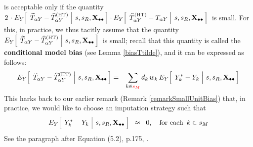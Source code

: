 \begin{itemize}
    is acceptable only if the quantity
    \,$
    2\,\cdot E_{Y}\!\left[\;
        \left.
        \widetilde{T}_{\alpha Y} - \widehat{T}^{\textnormal{(HT)}}_{\alpha Y}
        \;\right\vert\,
        s,s_{R},\mathbf{X}_{\bullet\bullet}
        \,\right]
    \cdot
    {\color{black}E_{Y}\!\left[\;
        \left.
        \widehat{T}^{\textnormal{(HT)}}_{\alpha Y} - T_{\alpha Y}
        \;\right\vert\,
        s,s_{R},\mathbf{X}_{\bullet\bullet}\,\right]}
    $\,
    is small.
    \vskip 0.1cm
    \noindent
    For this, in practice, we thus {\color{red}tacitly assume} that the quantity
    \,$
    E_{Y}\!\left[\;
        \left.
        \widetilde{T}_{\alpha Y} \overset{{\color{white}.}}{-} \widehat{T}^{\textnormal{(HT)}}_{\alpha Y}
        \;\right\vert\,
        s,s_{R},\Xobs
        \,\right]
    $\,
    is small;
    recall that this quantity is called the \textbf{conditional model bias}
    (see Lemma \ref{biasTtilde}), and
    it can be expressed as follows:
    \begin{eqnarray*}
    E_{Y}\!\left[\;
        \left.
        \widetilde{T}_{\alpha Y} \overset{{\color{white}.}}{-} \widehat{T}^{\textnormal{(HT)}}_{\alpha Y}
        \;\right\vert\,
        s,s_{R},\Xobs
        \,\right]
    & = &
        \underset{k\in{\color{red}s_{M}}}{\sum}\,d_{k}\,w_{k}\,
        E_{Y}\!\left[\;
            \left.
            Y^{*}_{k} \overset{{\color{white}.}}{-} Y_{k}
            \;\right\vert\,
            s,s_{R},\Xobs
            \,\right]
    \end{eqnarray*}
    This harks back to our earlier remark (Remark \ref{remarkSmallUnitBias}) that,
    in practice, we would like to choose an imputation strategy such that
    \begin{equation*}
    E_{Y}\!\left[\;
        \left.
        Y^{*}_{k} \overset{{\color{white}.}}{-} Y_{k}
        \;\right\vert\,
        s,s_{R},\Xobs
        \,\right]
    \;\; \approx \;\;
        0,
    \quad
    \textnormal{for each \,$k \in s_{M}$}
    \end{equation*}
    See the paragraph after Equation (5.2), p.175, \cite{Beaumont2011}.
\end{itemize}

